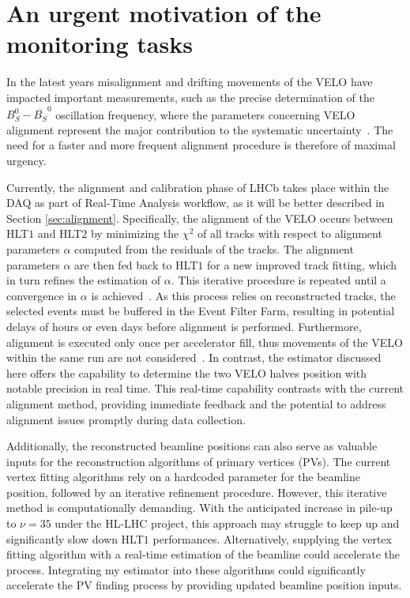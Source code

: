 \section{An urgent motivation of the monitoring tasks}

In the latest years misalignment and drifting movements of the VELO have impacted important measurements, such as the precise determination of the $B_S^0-\overline{B_S} ^0$ oscillation frequency, where the parameters concerning VELO alignment represent the major contribution to the systematic uncertainty~\cite{b0b0soscillation}. The need for a faster and more frequent alignment procedure is therefore of maximal urgency.  
    
Currently, the alignment and calibration phase of LHCb takes place within the DAQ as part of Real-Time Analysis workflow, as it will be better described in Section \ref{sec:alignment}. Specifically, the alignment of the VELO occurs between HLT$1$ and HLT$2$ by minimizing the $\chi^2$ of all tracks with respect to alignment parameters $\alpha$ computed from the residuals of the tracks. The alignment parameters $\alpha$ are then fed back to HLT$1$ for a new improved track fitting, which in turn refines the estimation of $\alpha$. This iterative procedure is repeated until a convergence in $\alpha$ is achieved~\cite{FRUHWIRTH1987444, Frühwirth:803519}. As this process relies on reconstructed tracks, the selected events must be buffered in the Event Filter Farm, resulting in potential delays of hours or even days before alignment is performed. Furthermore, alignment is executed only once per accelerator fill, thus movements of the VELO within the same run are not considered~\cite{Dziurda:2640712}. In contrast, the estimator discussed here offers the capability to determine the two VELO halves position with notable precision in real time. This real-time capability contrasts with the current alignment method, providing immediate feedback and the potential to address alignment issues promptly during data collection.

Additionally, the reconstructed beamline positions can also serve as valuable inputs for the reconstruction algorithms of primary vertices (PVs). The current vertex fitting algorithms rely on a hardcoded parameter for the beamline position, followed by an iterative refinement procedure. However, this iterative method is computationally demanding. With the anticipated increase in pile-up to $\nu=35$ under the HL-LHC project, this approach may struggle to keep up and significantly slow down HLT$1$ performances. Alternatively, supplying the vertex fitting algorithm with a real-time estimation of the beamline could accelerate the process. Integrating my estimator into these algorithms could significantly accelerate the PV finding process by providing updated beamline position inputs.

